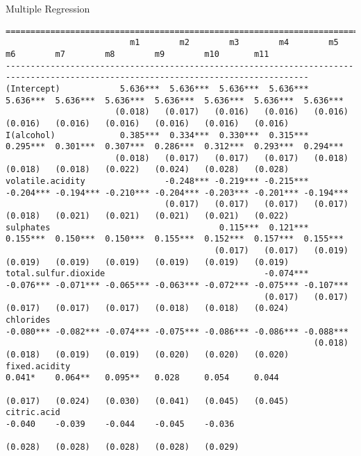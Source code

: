 \documentclass{mine}
\begin{document}
\begin{slide}{Multiple Regression}
    \tiny
    \begin{verbatim}
===================================================================================================================================
                         m1        m2        m3        m4        m5        m6        m7        m8        m9        m10       m11   
-----------------------------------------------------------------------------------------------------------------------------------
(Intercept)            5.636***  5.636***  5.636***  5.636***  5.636***  5.636***  5.636***  5.636***  5.636***  5.636***  5.636***
                      (0.018)   (0.017)   (0.016)   (0.016)   (0.016)   (0.016)   (0.016)   (0.016)   (0.016)   (0.016)   (0.016)  
I(alcohol)             0.385***  0.334***  0.330***  0.315***  0.295***  0.301***  0.307***  0.286***  0.312***  0.293***  0.294***
                      (0.018)   (0.017)   (0.017)   (0.017)   (0.018)   (0.018)   (0.018)   (0.022)   (0.024)   (0.028)   (0.028)  
volatile.acidity                -0.248*** -0.219*** -0.215*** -0.204*** -0.194*** -0.210*** -0.204*** -0.203*** -0.201*** -0.194***
                                (0.017)   (0.017)   (0.017)   (0.017)   (0.018)   (0.021)   (0.021)   (0.021)   (0.021)   (0.022)  
sulphates                                  0.115***  0.121***  0.155***  0.150***  0.150***  0.155***  0.152***  0.157***  0.155***
                                          (0.017)   (0.017)   (0.019)   (0.019)   (0.019)   (0.019)   (0.019)   (0.019)   (0.019)  
total.sulfur.dioxide                                -0.074*** -0.076*** -0.071*** -0.065*** -0.063*** -0.072*** -0.075*** -0.107***
                                                    (0.017)   (0.017)   (0.017)   (0.017)   (0.017)   (0.018)   (0.018)   (0.024)  
chlorides                                                     -0.080*** -0.082*** -0.074*** -0.075*** -0.086*** -0.086*** -0.088***
                                                              (0.018)   (0.018)   (0.019)   (0.019)   (0.020)   (0.020)   (0.020)  
fixed.acidity                                                            0.041*    0.064**   0.095**   0.028     0.054     0.044   
                                                                        (0.017)   (0.024)   (0.030)   (0.041)   (0.045)   (0.045)  
citric.acid                                                                       -0.040    -0.039    -0.044    -0.045    -0.036   
                                                                                  (0.028)   (0.028)   (0.028)   (0.028)   (0.029)  

\end{verbatim}
\end{slide}
\end{document}
